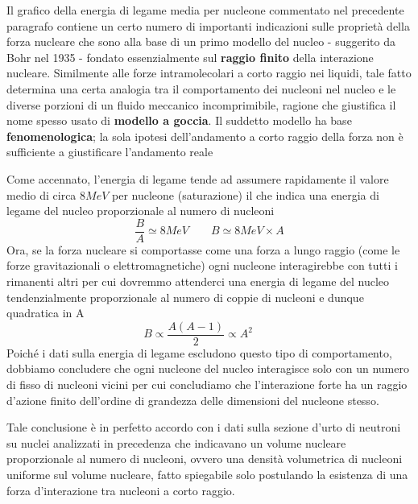 Il grafico della energia di legame media per nucleone commentato nel
precedente paragrafo contiene un certo numero di importanti indicazioni
sulle proprietà della forza nucleare che sono alla base di un primo
modello del nucleo - suggerito da Bohr nel 1935 - fondato essenzialmente
sul \textbf{raggio finito} della interazione nucleare.
Similmente alle
forze intramolecolari a corto raggio nei liquidi, tale fatto determina
una certa analogia tra il comportamento dei nucleoni nel nucleo e le
diverse porzioni di un fluido meccanico incomprimibile, ragione che
giustifica il nome spesso usato di \textbf{modello a goccia}.
Il
suddetto modello ha base \textbf{fenomenologica}; la sola ipotesi
dell'andamento a corto raggio della forza non è sufficiente a
giustificare l'andamento reale

Come accennato, l'energia di legame tende ad assumere rapidamente il
valore medio di circa \(8MeV\) per nucleone (saturazione) il che indica
una energia di legame del nucleo proporzionale al numero di nucleoni \[
                                                                         \frac{B}{A} \simeq 8 MeV \qquad B \simeq 8 MeV \times A
\] Ora, se la forza nucleare si comportasse come una forza a lungo
raggio (come le forze gravitazionali o elettromagnetiche) ogni nucleone
interagirebbe con tutti i rimanenti altri per cui dovremmo attenderci
una energia di legame del nucleo tendenzialmente proporzionale al numero
di coppie di nucleoni e dunque quadratica in A \[
                                                   B \propto \frac{A(A-1)}{2} \propto A^{2} \qquad
\] Poiché i dati sulla energia di legame escludono questo tipo di
comportamento, dobbiamo concludere che ogni nucleone del nucleo
interagisce solo con un numero di fisso di nucleoni vicini per cui
concludiamo che l'interazione forte ha un raggio d'azione finito
dell'ordine di grandezza delle dimensioni del nucleone stesso.

Tale conclusione è in perfetto accordo con i dati sulla sezione d'urto
di neutroni su nuclei analizzati in precedenza che indicavano un volume
nucleare proporzionale al numero di nucleoni, ovvero una densità
volumetrica di nucleoni uniforme sul volume nucleare, fatto spiegabile
solo postulando la esistenza di una forza d'interazione tra nucleoni a
corto raggio.

